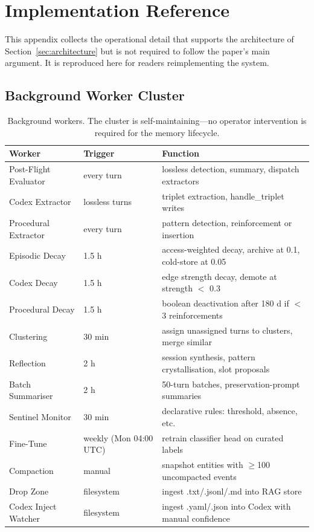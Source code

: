 \documentclass[11pt,a4paper]{article}
\begin{document}
\appendix
\section{Implementation Reference}
\label{app:implementation}

This appendix collects the operational detail that supports the architecture of Section~\ref{sec:architecture} but is not required to follow the paper's main argument. It is reproduced here for readers reimplementing the system.

\subsection{Background Worker Cluster}
\label{app:workers}

\begin{table}[htbp]
\centering
\small
\caption{Background workers. The cluster is self-maintaining---no operator intervention is required for the memory lifecycle.}
\label{tab:workers}
\begin{tabular}{@{}L{3.2cm}L{2.6cm}L{7cm}@{}}
\toprule
\textbf{Worker} & \textbf{Trigger} & \textbf{Function} \\
\midrule
Post-Flight Evaluator & every turn & lossless detection, summary, dispatch extractors \\
Codex Extractor      & lossless turns  & triplet extraction, handle\_triplet writes \\
Procedural Extractor  & every turn      & pattern detection, reinforcement or insertion \\
Episodic Decay        & 1.5 h           & access-weighted decay, archive at 0.1, cold-store at 0.05 \\
Codex Decay           & 1.5 h           & edge strength decay, demote at strength $<$ 0.3 \\
Procedural Decay      & 1.5 h           & boolean deactivation after 180 d if $<$ 3 reinforcements \\
Clustering            & 30 min          & assign unassigned turns to clusters, merge similar \\
Reflection            & 2 h             & session synthesis, pattern crystallisation, slot proposals \\
Batch Summariser      & 2 h             & 50-turn batches, preservation-prompt summaries \\
Sentinel Monitor      & 30 min          & declarative rules: threshold, absence, etc. \\
Fine-Tune             & weekly (Mon 04:00 UTC) & retrain classifier head on curated labels \\
Compaction            & manual          & snapshot entities with $\geq$100 uncompacted events \\
Drop Zone             & filesystem      & ingest .txt/.jsonl/.md into RAG store \\
Codex Inject Watcher  & filesystem      & ingest .yaml/.json into Codex with manual confidence \\
\bottomrule
\end{tabular}
\end{table}
\end{document}

